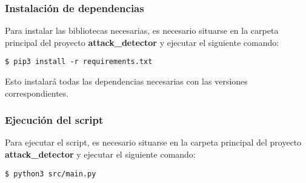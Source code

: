 \subsubsection{Instalación de dependencias}
\label{subsubsec:InstalacionDependencias}
Para instalar las bibliotecas necesarias, es necesario situarse en la carpeta principal del proyecto \textbf{attack\_detector} y ejecutar el siguiente comando:

\begin{verbatim}
$ pip3 install -r requirements.txt
\end{verbatim}

Esto instalará todas las dependencias necesarias con las versiones correspondientes.

\subsubsection{Ejecución del script}
\label{subsubsec:EjecucionScript}
Para ejecutar el script, es necesario situarse en la carpeta principal del proyecto \textbf{attack\_detector} y ejecutar el siguiente comando:

\begin{verbatim}
$ python3 src/main.py
\end{verbatim}

